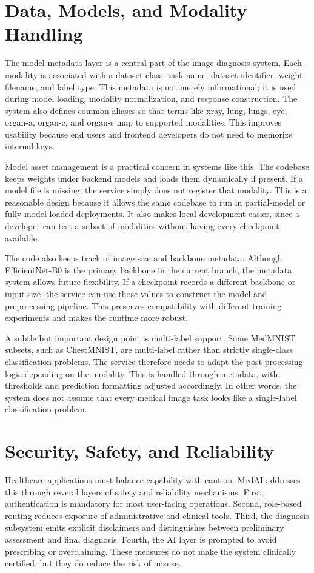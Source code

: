 \documentclass[conference]{IEEEtran}
\begin{document}
\section{Data, Models, and Modality Handling}
The model metadata layer is a central part of the image diagnosis system. Each modality is associated with a dataset class, task name, dataset identifier, weight filename, and label type. This metadata is not merely informational; it is used during model loading, modality normalization, and response construction. The system also defines common aliases so that terms like xray, lung, lungs, eye, organ-a, organ-c, and organ-s map to supported modalities. This improves usability because end users and frontend developers do not need to memorize internal keys.

Model asset management is a practical concern in systems like this. The codebase keeps weights under backend models and loads them dynamically if present. If a model file is missing, the service simply does not register that modality. This is a reasonable design because it allows the same codebase to run in partial-model or fully model-loaded deployments. It also makes local development easier, since a developer can test a subset of modalities without having every checkpoint available.

The code also keeps track of image size and backbone metadata. Although EfficientNet-B0 is the primary backbone in the current branch, the metadata system allows future flexibility. If a checkpoint records a different backbone or input size, the service can use those values to construct the model and preprocessing pipeline. This preserves compatibility with different training experiments and makes the runtime more robust.

A subtle but important design point is multi-label support. Some MedMNIST subsets, such as ChestMNIST, are multi-label rather than strictly single-class classification problems. The service therefore needs to adapt the post-processing logic depending on the modality. This is handled through metadata, with thresholds and prediction formatting adjusted accordingly. In other words, the system does not assume that every medical image task looks like a single-label classification problem.

\section{Security, Safety, and Reliability}
Healthcare applications must balance capability with caution. MedAI addresses this through several layers of safety and reliability mechanisms. First, authentication is mandatory for most user-facing operations. Second, role-based routing reduces exposure of administrative and clinical tools. Third, the diagnosis subsystem emits explicit disclaimers and distinguishes between preliminary assessment and final diagnosis. Fourth, the AI layer is prompted to avoid prescribing or overclaiming. These measures do not make the system clinically certified, but they do reduce the risk of misuse.
\end{document}

